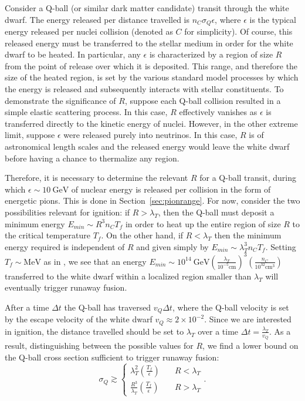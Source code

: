 \documentclass[11 pt, preprint,preprintnumbers,amsmath,amssymb, prd]{revtex4}
\newcommand{\GeV}{\text{GeV}}
\def\r{\right)}
\def\l{\left(}
\begin{document}
Consider a Q-ball (or similar dark matter candidate) transit through the white dwarf. The energy released per distance travelled is $n_C \sigma_Q \epsilon$, where $\epsilon$ is the typical energy released per nuclei collision (denoted as $C$ for simplicity). Of course, this released energy must be transferred to the stellar medium in order for the white dwarf to be heated. In particular, any $\epsilon$ is characterized by a region of size $R$ from the point of release over which it is deposited. This range, and therefore the size of the heated region, is set by the various standard model processes by which the energy is released and subsequently interacts with stellar constituents. To demonstrate the significance of $R$, suppose each Q-ball collision resulted in a simple elastic scattering process. In this case, $R$ effectively vanishes as $\epsilon$ is transferred directly to the kinetic energy of nuclei. However, in the other extreme limit, suppose $\epsilon$ were released purely into neutrinos. In this case, $R$ is of astronomical length scales and the released energy would leave the white dwarf before having a chance to thermalize any region. 

Therefore, it is necessary to determine the relevant $R$ for a Q-ball transit, during which $\epsilon \sim 10 ~\GeV$ of nuclear energy is released per collision in the form of energetic pions. This is done in Section~\ref{sec:pionrange}. For now, consider the two possibilities relevant for ignition: if $R> \lambda_T$, then the Q-ball must deposit a minimum energy $E_{min} \sim R^3 n_C T_f$ in order to heat up the entire region of size $R$ to the critical temperature $T_f$. On the other hand, if $R < \lambda_T$ then the minimum energy required is independent of $R$ and given simply by $E_{min} \sim \lambda_T^3 n_C T_f$. Setting $T_f \sim \text{MeV}$ as in \cite{Varela}, we see that an energy $E_{min} \sim 10^{14} ~\text{GeV} \l \frac{\lambda_T}{10^{-5} \text{cm}} \r^3 \l \frac{n_C}{10^{32} \text{cm}^3} \r$ transferred to the white dwarf within a localized region smaller than $\lambda_T$ will eventually trigger runaway fusion. 

After a time $\Delta t$ the Q-ball has traversed $v_Q \Delta t$, where the Q-ball velocity is set by the escape velocity of the white dwarf $v_Q \approx 2 \times 10^{-2}$. Since we are interested in ignition, the distance travelled should be set to $\lambda_T$ over a time $\Delta t = \frac{\lambda_T}{v_Q}$. As a result, distinguishing between the possible values for $R$, we find a lower bound on the Q-ball cross section sufficient to trigger runaway fusion: 
\begin{equation}
\label{eq:explosion}
\sigma_Q \gtrsim \left\{
        \begin{array}{ll}
            \displaystyle \lambda_T^2 \l \frac{T_f}{\epsilon} \r & \quad R < \lambda_T \\
             \frac{R^3}{\lambda_T} \l \frac{T_f}{\epsilon} \r & \quad R > \lambda_T
        \end{array}
    \right..
\end{equation}
\end{document}
